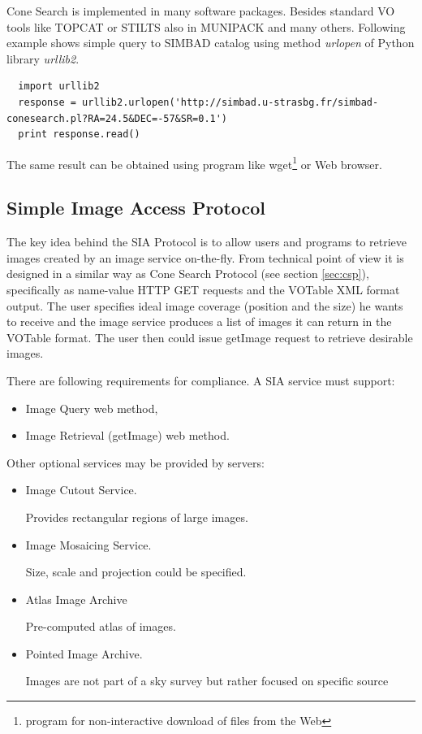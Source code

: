 Cone Search is implemented in many software packages. Besides standard
VO tools like TOPCAT or STILTS also in MUNIPACK and many others.
Following example shows simple query to SIMBAD \citep{wenger2000simbad}
catalog using method \emph{urlopen} of Python library \emph{urllib2}.
 
\begin{lstlisting}
  import urllib2
  response = urllib2.urlopen('http://simbad.u-strasbg.fr/simbad-conesearch.pl?RA=24.5&DEC=-57&SR=0.1')
  print response.read()
\end{lstlisting}

\noindent The same result can be obtained using program like wget\footnote{program
  for non-interactive download of files from the Web} or Web browser.

\subsection{Simple Image Access Protocol}
The key idea behind the SIA Protocol is to allow users and programs to
retrieve images created by an image service on-the-fly. From technical
point of view it is designed in a similar way as Cone Search Protocol
(see section \ref{sec:csp}), specifically as name-value HTTP GET
requests and the VOTable XML format output. The user specifies ideal
image coverage (position and the size) he wants to receive and the
image service produces a list of images it can return in the VOTable
format. The user then could issue getImage request to retrieve
desirable images.

There are following requirements for compliance. A SIA service must
support:

\begin{itemize}
\item Image Query web method,
\item Image Retrieval (getImage) web method.
\end{itemize}

\noindent Other optional services may be provided by servers: 

\begin{itemize}
\item Image Cutout Service.

  Provides rectangular regions of large images.
\item Image Mosaicing Service.

  Size, scale and projection could be specified.
\item Atlas Image Archive

  Pre-computed atlas of images.
\item Pointed Image Archive.  

  Images are not part of a sky survey but
  rather focused on specific source
\end{itemize}


